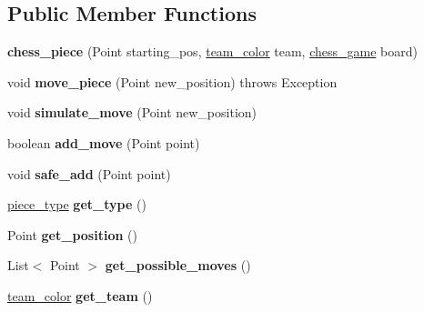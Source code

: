 \subsection*{Public Member Functions}
\begin{DoxyCompactItemize}
\item 
\hypertarget{classchess__core_1_1chess__piece_ae20fe8201ff79d7fcbc6f80fa6315fc4}{}{\bfseries chess\+\_\+piece} (Point starting\+\_\+pos, \hyperlink{enumchess__core_1_1team__color}{team\+\_\+color} team, \hyperlink{classchess__core_1_1chess__game}{chess\+\_\+game} board)\label{classchess__core_1_1chess__piece_ae20fe8201ff79d7fcbc6f80fa6315fc4}

\item 
\hypertarget{classchess__core_1_1chess__piece_a06a36898ea2909b718ddd001ef0386ac}{}void {\bfseries move\+\_\+piece} (Point new\+\_\+position)  throws Exception\label{classchess__core_1_1chess__piece_a06a36898ea2909b718ddd001ef0386ac}

\item 
\hypertarget{classchess__core_1_1chess__piece_aa7f23946622ad63461492d95f5fb095e}{}void {\bfseries simulate\+\_\+move} (Point new\+\_\+position)\label{classchess__core_1_1chess__piece_aa7f23946622ad63461492d95f5fb095e}

\item 
\hypertarget{classchess__core_1_1chess__piece_a80e2e675b899fa530b56c0670aec2c98}{}boolean {\bfseries add\+\_\+move} (Point point)\label{classchess__core_1_1chess__piece_a80e2e675b899fa530b56c0670aec2c98}

\item 
\hypertarget{classchess__core_1_1chess__piece_a92463a5265b949fccf53522da8230bc4}{}void {\bfseries safe\+\_\+add} (Point point)\label{classchess__core_1_1chess__piece_a92463a5265b949fccf53522da8230bc4}

\item 
\hypertarget{classchess__core_1_1chess__piece_ac726b474dc222bdb9a4a8043d5e4b203}{}\hyperlink{enumchess__core_1_1piece__type}{piece\+\_\+type} {\bfseries get\+\_\+type} ()\label{classchess__core_1_1chess__piece_ac726b474dc222bdb9a4a8043d5e4b203}

\item 
\hypertarget{classchess__core_1_1chess__piece_ab6b3ac1a35546681062effa03e9a2c5b}{}Point {\bfseries get\+\_\+position} ()\label{classchess__core_1_1chess__piece_ab6b3ac1a35546681062effa03e9a2c5b}

\item 
\hypertarget{classchess__core_1_1chess__piece_a71787594c92088a269afc5f36c280a36}{}List$<$ Point $>$ {\bfseries get\+\_\+possible\+\_\+moves} ()\label{classchess__core_1_1chess__piece_a71787594c92088a269afc5f36c280a36}

\item 
\hypertarget{classchess__core_1_1chess__piece_a05ecf4fad3195cb33a24f33b51c68738}{}\hyperlink{enumchess__core_1_1team__color}{team\+\_\+color} {\bfseries get\+\_\+team} ()\label{classchess__core_1_1chess__piece_a05ecf4fad3195cb33a24f33b51c68738}

\end{DoxyCompactItemize}
